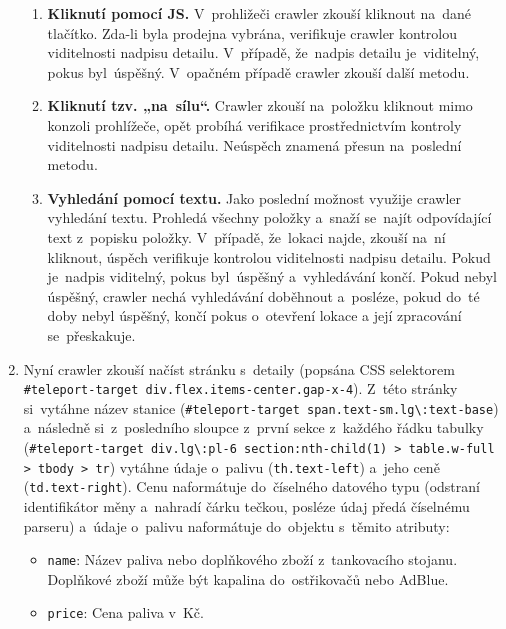 \begin{enumerate}
        \begin{enumerate}
            \item \textbf{Kliknutí pomocí JS.} V~prohližeči crawler zkouší
                kliknout na~dané tlačítko. Zda-li byla prodejna vybrána,
                verifikuje crawler kontrolou viditelnosti nadpisu detailu.
                V~případě, že~nadpis detailu je~viditelný, pokus byl~úspěšný.
                V~opačném případě crawler zkouší další metodu.
            \item \textbf{Kliknutí tzv. „na~sílu“.} Crawler zkouší na~položku
                kliknout mimo konzoli prohlížeče, opět probíhá verifikace
                prostřednictvím kontroly viditelnosti nadpisu detailu.
                Neúspěch znamená přesun na~poslední metodu.
            \item \textbf{Vyhledání pomocí textu.} Jako poslední možnost
                využije crawler vyhledání textu. Prohledá všechny položky
                a~snaží se~najít odpovídající text z~popisku položky.
                V~případě, že~lokaci najde, zkouší na~ní kliknout, úspěch
                verifikuje kontrolou viditelnosti nadpisu detailu. Pokud
                je~nadpis viditelný, pokus byl~úspěšný a~vyhledávání končí.
                Pokud nebyl úspěšný, crawler nechá vyhledávání doběhnout
                a~posléze, pokud do~té doby nebyl úspěšný, končí pokus
                o~otevření lokace a její zpracování se~přeskakuje.
        \end{enumerate}
    \item Nyní crawler zkouší načíst stránku s~detaily (popsána CSS
        selektorem \texttt{\#teleport-target div.flex.items-center.gap-x-4}).
        Z~této stránky si~vytáhne název stanice (\texttt{\#teleport-target
        span.text-sm.lg\textbackslash:text-base}) a~následně si~z~posledního
        sloupce z~první sekce z~každého řádku tabulky
        (\texttt{\#teleport-target
        div.lg\textbackslash:pl-6 section:nth-child(1)
        > table.w-full > tbody > tr}) vytáhne údaje o~palivu
        (\texttt{th.text-left}) a~jeho ceně (\texttt{td.text-right}). Cenu
        naformátuje do~číselného datového typu (odstraní identifikátor měny
        a~nahradí čárku tečkou, posléze údaj předá číselnému parseru)
        a~údaje o~palivu naformátuje do~objektu s~těmito atributy:

        \begin{itemize}
            \item \texttt{name}: Název paliva nebo doplňkového zboží z~tankovacího
                stojanu. Doplňkové zboží může být kapalina do~ostřikovačů nebo AdBlue.
            \item \texttt{price}: Cena paliva v~Kč.
        \end{itemize}
        

\end{enumerate}

